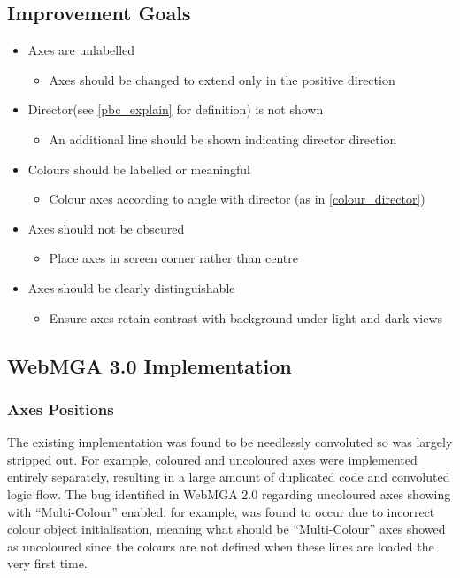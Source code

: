 \subsection{Improvement Goals}
\begin{itemize}
  \item Axes are unlabelled
    \begin{itemize}
      \item Axes should be changed to extend only in the positive direction
    \end{itemize}
  \item Director(see \cref{pbc_explain} for definition) is not shown
    \begin{itemize}
      \item An additional line should be shown indicating director direction
    \end{itemize}
  \item Colours should be labelled or meaningful
    \begin{itemize}
      \item Colour axes according to angle with director (as in \cref{colour_director})
    \end{itemize}
  \item Axes should not be obscured
    \begin{itemize}
      \item Place axes in screen corner rather than centre
    \end{itemize}
  \item Axes should be clearly distinguishable
    \begin{itemize}
      \item Ensure axes retain contrast with background under light and dark views
    \end{itemize}
\end{itemize}

\subsection{WebMGA 3.0 Implementation}
\subsubsection{Axes Positions}
\label{axes_positions_sec}
The existing implementation was found to be needlessly convoluted so was largely stripped out. For example, coloured and uncoloured axes were implemented entirely separately, resulting in a large amount of duplicated code and convoluted logic flow. The bug identified in WebMGA 2.0 regarding uncoloured axes showing with ``Multi-Colour'' enabled, for example, was found to occur due to incorrect colour object initialisation, meaning what should be ``Multi-Colour'' axes showed as uncoloured since the colours are not defined when these lines are loaded the very first time.

